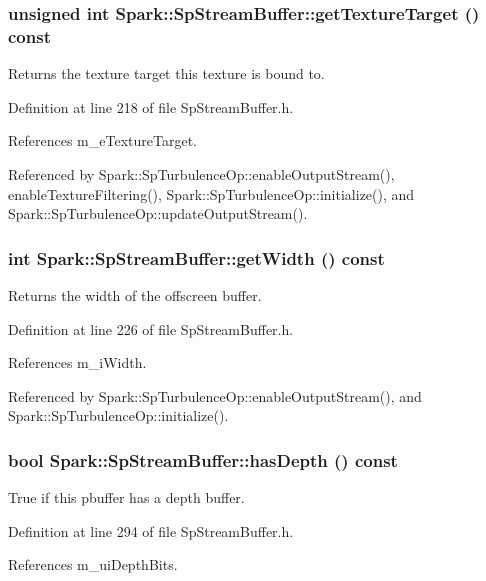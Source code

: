 \subsubsection{\setlength{\rightskip}{0pt plus 5cm}unsigned int Spark::Sp\-Stream\-Buffer::get\-Texture\-Target () const\hspace{0.3cm}{\tt  [inline]}}\label{classSpark_1_1SpStreamBuffer_a17}


Returns the texture target this texture is bound to. 

Definition at line 218 of file Sp\-Stream\-Buffer.h.

References m\_\-e\-Texture\-Target.

Referenced by Spark::Sp\-Turbulence\-Op::enable\-Output\-Stream(), enable\-Texture\-Filtering(), Spark::Sp\-Turbulence\-Op::initialize(), and Spark::Sp\-Turbulence\-Op::update\-Output\-Stream().
\subsubsection{\setlength{\rightskip}{0pt plus 5cm}int Spark::Sp\-Stream\-Buffer::get\-Width () const\hspace{0.3cm}{\tt  [inline]}}\label{classSpark_1_1SpStreamBuffer_a19}


Returns the width of the offscreen buffer. 

Definition at line 226 of file Sp\-Stream\-Buffer.h.

References m\_\-i\-Width.

Referenced by Spark::Sp\-Turbulence\-Op::enable\-Output\-Stream(), and Spark::Sp\-Turbulence\-Op::initialize().
\subsubsection{\setlength{\rightskip}{0pt plus 5cm}bool Spark::Sp\-Stream\-Buffer::has\-Depth () const\hspace{0.3cm}{\tt  [inline]}}\label{classSpark_1_1SpStreamBuffer_a36}


True if this pbuffer has a depth buffer. 

Definition at line 294 of file Sp\-Stream\-Buffer.h.

References m\_\-ui\-Depth\-Bits.
